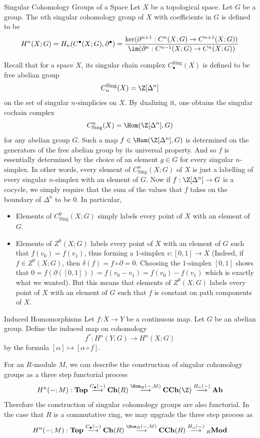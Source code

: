 \documentclass[a4paper]{article}
\begin{document}
\begin{defn}{Singular Cohomology Groups of a Space}{} Let $X$ be a topological space. Let $G$ be a group. The $n$th singular cohomology group of $X$ with coefficients in $G$ is defined to be $$H^n(X;G)=H_n(C^\bullet(X;G),\partial^\bullet)=\frac{\ker(\partial^{n+1}:C^n(X;G)\to C^{n+1}(X;G))}{\im(\partial^n:C^{n-1}(X;G)\to C^n(X;G))}$$
\end{defn}

Recall that for a space $X$, its singular chain complex $C_\bullet^\text{Sing}(X)$ is defined to be free abelian group $$C_n^\text{Sing}(X)=\Z[\Delta^n]$$ on the set of singular $n$-simplicies on $X$. By dualizing it, one obtains the singular cochain complex $$C_\text{Sing}^n(X)=\Hom(\Z[\Delta^n],G)$$ for any abelian group $G$. Such a map $f\in\Hom(\Z[\Delta^n],G)$ is determined on the generators of the free abelian group by its universal property. And so $f$ is essentially determined by the choice of an element $g\in G$ for every singular $n$-simplex. In other words, every element of $C_\text{Sing}^n(X;G)$ of $X$ is just a labelling of every singular $n$-simplex with an element of $G$. Now if $f:\Z[\Delta^n]\to G$ is a cocycle, we simply require that the sum of the values that $f$ takes on the boundary of $\Delta^n$ to be $0$. In particular, 
\begin{itemize}
\item Elements of $C_\text{Sing}^0(X;G)$ simply labels every point of $X$ with an element of $G$. 
\item Elements of $Z^0(X;G)$ labels every point of $X$ with an element of $G$ such that $f(v_0)=f(v_1)$, thus forming a $1$-simplex $v:[0,1]\to X$ (Indeed, if $f\in Z^0(X;G)$, then $\delta(f)=f\circ\partial=0$. Choosing the $1$-simplex $[0,1]$ shows that $0=f(\partial([0,1]))=f(v_0-v_1)=f(v_0)-f(v_1)$ which is exactly what we wanted). But this means that elements of $Z^0(X;G)$ labels every point of $X$ with an element of $G$ such that $f$ is constant on path components of $X$. 
\end{itemize}

\begin{defn}{Induced Homomorphisms}{} Let $f:X\to Y$ be a continuous map. Let $G$ be an abelian group. Define the induced map on cohomology $$f^\ast:H^n(Y;G)\to H^n(X;G)$$ by the formula $[\alpha]\mapsto[\alpha\circ f]$. 
\end{defn}

For an $R$-module $M$, we can describe the construction of singular cohomology groups as a three step functorial process $$H^n(-;M):\bold{Top}\overset{C_\bullet(-)}{\longrightarrow}\bold{Ch}(R)\overset{\Hom_R(-,M)}{\longrightarrow}\bold{CCh}(\Z)\overset{H_n(-)}{\longrightarrow}\bold{Ab}$$ Therefore the construction of singular cohomology groups are also functorial. In the case that $R$ is a commutative ring, we may upgrade the three step process as $$H^n(-;M):\bold{Top}\overset{C_\bullet(-)}{\longrightarrow}\bold{Ch}(R)\overset{\Hom_R(-,M)}{\longrightarrow}\bold{CCh}(R)\overset{H_n(-)}{\longrightarrow}{_R\bold{Mod}}$$
\end{document}
